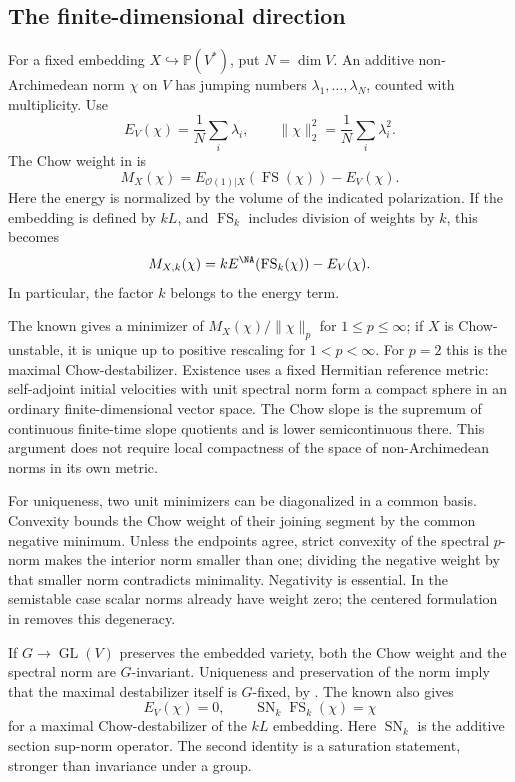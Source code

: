 \subsection{The finite-dimensional direction}

For a fixed embedding $X\hookrightarrow\mathbb P(V^*)$, put
$N=\dim V$. An additive non-Archimedean norm $\chi$ on $V$ has jumping
numbers $\lambda_1,\ldots,\lambda_N$, counted with multiplicity. Use
\[
 E_V(\chi)=\frac1N\sum_i\lambda_i,
 \qquad
 \|\chi\|_2^2=\frac1N\sum_i\lambda_i^2.
\]
The Chow weight in \cite[Theorem~33]{Yao25MaximalDestabilizers} is
\[
 M_X(\chi)=E_{\mathcal O(1)|X}(\operatorname{FS}(\chi))-E_V(\chi).
\]
Here the energy is normalized by the volume of the indicated
polarization. If the embedding is defined by $kL$, and
$\operatorname{FS}_k$ includes division of weights by $k$, this becomes
\[
 M_{X,k}(\chi)=kE^{\NA}(\operatorname{FS}_k(\chi))-E_V(\chi).
\]
In particular, the factor $k$ belongs to the energy term.

The known \cite[Theorem~20]{Yao25MaximalDestabilizers} gives a minimizer
of $M_X(\chi)/\|\chi\|_p$ for $1\leq p\leq\infty$; if $X$ is
Chow-unstable, it is unique up to positive rescaling for $1<p<\infty$.
For $p=2$ this is the maximal Chow-destabilizer. Existence uses a
fixed Hermitian reference metric: self-adjoint initial velocities
with unit spectral norm form a compact sphere in an ordinary
finite-dimensional vector space. The Chow slope is the supremum of
continuous finite-time slope quotients and is lower semicontinuous
there. This argument does not require local compactness of the space
of non-Archimedean norms in its own metric.

For uniqueness, two unit minimizers can be diagonalized in a common
basis. Convexity bounds the Chow weight of their joining segment by
the common negative minimum. Unless the endpoints agree, strict
convexity of the spectral $p$-norm makes the interior norm smaller
than one; dividing the negative weight by that smaller norm contradicts
minimality. Negativity is essential. In the semistable case scalar
norms already have weight zero; the centered formulation in
\cite[Remark~21]{Yao25MaximalDestabilizers} removes this degeneracy.

If $G\to\operatorname{GL}(V)$ preserves the embedded variety, both
the Chow weight and the spectral norm are $G$-invariant. Uniqueness
and preservation of the norm imply that the maximal destabilizer
itself is $G$-fixed, by \cite[Theorem~23]{Yao25MaximalDestabilizers}.
The known \cite[Theorem~36]{Yao25MaximalDestabilizers} also gives
\[
 E_V(\chi)=0,
 \qquad
 \operatorname{SN}_k\operatorname{FS}_k(\chi)=\chi
\]
for a maximal Chow-destabilizer of the $kL$ embedding. Here
$\operatorname{SN}_k$ is the additive section sup-norm operator.
The second identity is a saturation statement, stronger than
invariance under a group.

